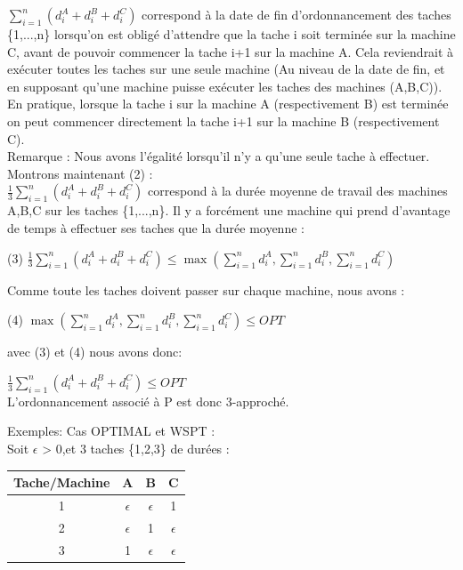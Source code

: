 \documentclass[12pt]{article}
\begin{document}
$\displaystyle\sum_{i=1}^n(d_i^A+d_i^B+d_i^C)$ correspond à la date de fin d'ordonnancement des taches \{1,...,n\} lorsqu'on est obligé d'attendre que la tache i soit terminée sur la machine C, avant de pouvoir commencer la tache i+1 sur la machine A. Cela reviendrait à exécuter toutes les taches sur une seule machine (Au niveau de la date de fin, et en supposant qu'une machine puisse exécuter les taches des machines (A,B,C)). \\

En pratique, lorsque la tache i sur la machine A (respectivement B) est terminée on peut commencer directement la tache i+1 sur la machine B (respectivement C).\\

Remarque : Nous avons l'égalité lorsqu'il n'y a qu'une seule tache à effectuer.\\

Montrons maintenant (2) :\\

$\frac{1}{3}\displaystyle\sum_{i=1}^n(d_i^A+d_i^B+d_i^C)$ correspond à la durée moyenne de travail des machines A,B,C sur les taches \{1,...,n\}. Il y a forcément une machine qui prend d'avantage de temps à effectuer ses taches que la durée moyenne :\\
\begin{center}
(3) $\frac{1}{3}\displaystyle\sum_{i=1}^n(d_i^A+d_i^B+d_i^C) \le \max(\displaystyle\sum_{i=1}^n d_i^A,\displaystyle\sum_{i=1}^n d_i^B,\displaystyle\sum_{i=1}^n d_i^C)$\\
\end{center}
Comme toute les taches doivent passer sur chaque machine, nous avons :\\
\begin{center}
(4) $\max(\displaystyle\sum_{i=1}^n d_i^A,\displaystyle\sum_{i=1}^n d_i^B,\displaystyle\sum_{i=1}^n d_i^C) \le OPT$\\
\end{center}
avec (3) et (4) nous avons donc:\\
\begin{center}
$\frac{1}{3}\displaystyle\sum_{i=1}^n(d_i^A+d_i^B+d_i^C) \le OPT$\\

L'ordonnancement associé à P est donc 3-approché.
\end{center}
Exemples: Cas OPTIMAL et WSPT : \\ Soit $\epsilon$ > 0,et 3 taches \{1,2,3\} de durées :\\
\begin{center}
\begin{tabular}{|c|c|c|c|}
\hline 
Tache/Machine & A & B & C \\ 
\hline 
1 & $\epsilon$ & $\epsilon$ & 1 \\ 
\hline 
2 & $\epsilon$ & 1 & $\epsilon$ \\ 
\hline 
3 & 1 & $\epsilon$ & $\epsilon$ \\ 
\hline 
\end{tabular} 
\end{center}
\end{document}
